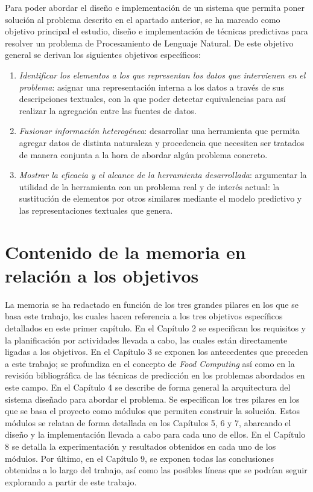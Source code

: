 Para poder abordar el diseño e implementación de un sistema que permita poner solución al problema descrito en el apartado anterior, se ha marcado como objetivo principal el estudio, diseño e implementación de técnicas predictivas para resolver un problema de Procesamiento de Lenguaje Natural. De este objetivo general se derivan los siguientes objetivos específicos:

\begin{enumerate}
    \item\textit{Identificar los elementos a los que representan los datos que intervienen en el problema}: asignar una representación interna a los datos a través de sus descripciones textuales, con la que poder detectar equivalencias para así realizar la agregación entre las fuentes de datos.

    \item\textit{Fusionar información heterogénea}: desarrollar una herramienta que permita agregar datos de distinta naturaleza y procedencia que necesiten ser tratados de manera conjunta a la hora de abordar algún problema concreto.
    
    \item\textit{Mostrar la eficacia y el alcance de la herramienta desarrollada}: argumentar la utilidad de la herramienta con un problema real y de interés actual: la sustitución de elementos por otros similares mediante el modelo predictivo y las representaciones textuales que genera.
    
\end{enumerate}

\section{Contenido de la memoria en relación a los objetivos}

La memoria se ha redactado en función de los tres grandes pilares en los que se basa este trabajo, los cuales hacen referencia a los tres objetivos específicos detallados en este primer capítulo. En el Capítulo 2 se especifican los requisitos y la planificación por actividades llevada a cabo, las cuales están directamente ligadas a los objetivos. En el Capítulo 3 se exponen los antecedentes que preceden a este trabajo; se profundiza en el concepto de \textit{Food Computing} así como en la revisión bibliográfica de las técnicas de predicción en los problemas abordados en este campo. En el Capítulo 4 se describe de forma general la arquitectura del sistema diseñado para abordar el problema. Se especifican los tres pilares en los que se basa el proyecto como módulos que permiten construir la solución. Estos módulos se relatan de forma detallada en los Capítulos 5, 6 y 7, abarcando el diseño y la implementación llevada a cabo para cada uno de ellos. En el Capítulo 8 se detalla la experimentación y resultados obtenidos en cada uno de los módulos. Por último, en el Capítulo 9, se exponen todas las conclusiones obtenidas a lo largo del trabajo, así como las posibles líneas que se podrían seguir explorando a partir de este trabajo. 

\newpage